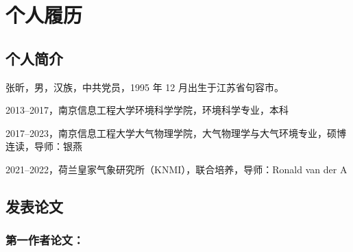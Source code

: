 
\cleardoublepage
{}
{}

\chapter*{个人履历}

\specialsectioning
\section{个人简介}

张昕，男，汉族，中共党员，1995 年 12 月出生于江苏省句容市。

2013--2017，南京信息工程大学环境科学学院，环境科学专业，本科

2017--2023，南京信息工程大学大气物理学院，大气物理学与大气环境专业，硕博连读，导师：银燕

2021--2022，荷兰皇家气象研究所（KNMI），联合培养，导师：Ronald van der A

\specialsectioning
\section{发表论文}

\subsection*{第一作者论文：}

